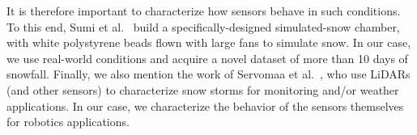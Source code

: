 It is therefore important to characterize how sensors behave in such conditions. To this end, Sumi et al.~\cite{sumi-arso-13} build a specifically-designed simulated-snow chamber, with white polystyrene beads flown with large fans to simulate snow. In our case, we use real-world conditions and acquire a novel dataset of more than 10 days of snowfall. Finally, we also mention the work of Servomaa et al.~\cite{servomaa2002snowfall}, who use LiDARs (and other sensors) to characterize snow storms for monitoring and/or weather applications. In our case, we characterize the behavior of the sensors themselves for robotics applications.








